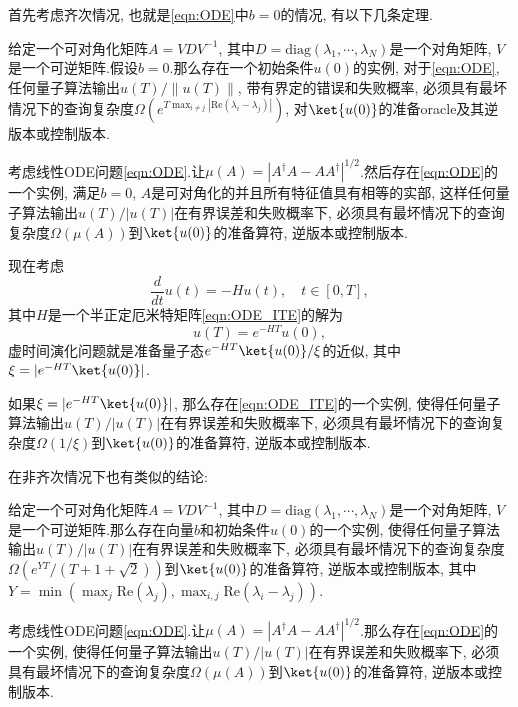 首先考虑齐次情况, 也就是\cref{eqn:ODE}中$b=0$的情况, 有以下几条定理\cite{31}.
\begin{theorem}\label{prop:lb_eig_diff_homo}
	给定一个可对角化矩阵$A = VDV^{-1}$, 其中$D = \text{diag}(\lambda_1,\cdots,\lambda_N)$是一个对角矩阵, $V$是一个可逆矩阵.假设$b = 0$.那么存在一个初始条件$u(0)$的实例, 对于\cref{eqn:ODE}, 任何量子算法输出$u(T)/\|u(T)\|$, 带有界定的错误和失败概率, 必须具有最坏情况下的查询复杂度$\Omega(e^{T\max_{i\neq j}|\text{Re}(\lambda_i-\lambda_j)|})$, 对$\ket{u(0)}$的准备oracle及其逆版本或控制版本.
\end{theorem}
\begin{theorem}\label{prop:lb_non_normal_homo}
	考虑线性ODE问题\cref{eqn:ODE}.让$\mu(A) = |A^{\dagger}A-AA^{\dagger}|^{1/2}$.然后存在\cref{eqn:ODE}的一个实例, 满足$b=0$, $A$是可对角化的并且所有特征值具有相等的实部, 这样任何量子算法输出$u(T)/|u(T)|$在有界误差和失败概率下, 必须具有最坏情况下的查询复杂度$\Omega(\mu(A))$到$\ket{u(0)}$的准备算符, 逆版本或控制版本.
\end{theorem}
现在考虑
\begin{equation}\label{eqn:ODE_ITE}
	\frac{d}{dt} u(t) = -H u(t), \quad t \in [0,T],
\end{equation}
其中$H$是一个半正定厄米特矩阵\cref{eqn:ODE_ITE}的解为
\begin{equation}
	u(T) = e^{-HT}u(0),
\end{equation}
虚时间演化问题就是准备量子态$e^{-HT}\ket{u(0)}/\xi$的近似, 其中$\xi = |e^{-HT}\ket{u(0)}|$.

\begin{theorem}
	如果$\xi = |e^{-HT}\ket{u(0)}|$, 那么存在\cref{eqn:ODE_ITE}的一个实例, 使得任何量子算法输出$u(T)/|u(T)|$在有界误差和失败概率下, 必须具有最坏情况下的查询复杂度$\Omega(1/\xi)$到$\ket{u(0)}$的准备算符, 逆版本或控制版本.
\end{theorem}
在非齐次情况下也有类似的结论:
\begin{theorem}\label{prop:lb_eig_diff_inhomo}
	给定一个可对角化矩阵$A = VDV^{-1}$, 其中$D = \text{diag}(\lambda_1,\cdots, \lambda_N)$是一个对角矩阵, $V$是一个可逆矩阵.那么存在向量$b$和初始条件$u(0)$的一个实例, 使得任何量子算法输出$u(T)/|u(T)|$在有界误差和失败概率下, 必须具有最坏情况下的查询复杂度$\Omega(e^{Y T}/(T+1+\sqrt{2}))$到$\ket{u(0)}$的准备算符, 逆版本或控制版本, 其中
	$Y = \min\left( \max_j \text{Re}(\lambda_j), \max_{i,j} \text{Re}(\lambda_i-\lambda_j) \right)$.
\end{theorem}

\begin{theorem}\label{prop:lb_non_normal_inhomo}
	考虑线性ODE问题\cref{eqn:ODE}.让$\mu(A) = |A^{\dagger}A-AA^{\dagger}|^{1/2}$.那么存在\cref{eqn:ODE}的一个实例, 使得任何量子算法输出$u(T)/|u(T)|$在有界误差和失败概率下, 必须具有最坏情况下的查询复杂度$\Omega(\mu(A))$到$\ket{u(0)}$的准备算符, 逆版本或控制版本.
\end{theorem}

